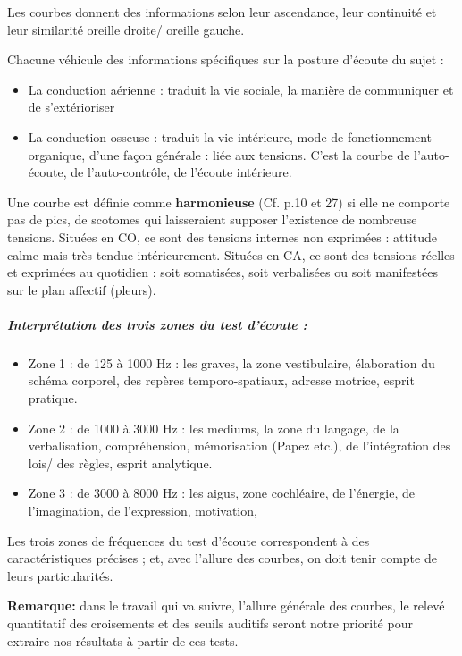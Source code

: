 Les courbes donnent des informations selon leur ascendance, leur
continuité et leur similarité oreille droite/ oreille gauche.
 
Chacune  véhicule des informations spécifiques
sur la posture d'écoute du sujet : 
\begin{itemize}
\item La conduction aérienne : traduit la vie sociale, la manière de communiquer
et de s'extérioriser
\item La conduction osseuse : traduit la vie intérieure, mode de fonctionnement
organique, d'une façon générale : liée aux tensions. C'est la courbe
de l\textquoteright auto-écoute, de l\textquoteright auto-contrôle,
de l'écoute intérieure.
\end{itemize}

Une courbe est définie comme \textbf{harmonieuse} (Cf. p.10 et 27) si elle ne comporte pas de
pics, de scotomes 
qui laisseraient
supposer l'existence de nombreuse tensions.
Situées en CO, ce sont des tensions internes non exprimées : attitude
calme mais très tendue intérieurement.
Situées en CA, ce sont des tensions réelles et exprimées au quotidien
: soit somatisées, soit verbalisées ou soit manifestées sur le plan
affectif (pleurs).

\subparagraph{Interprétation des trois zones du test d'écoute : }
\begin{itemize}
\item Zone 1 : de 125 à 1000 Hz : les graves, la zone vestibulaire, élaboration
du schéma corporel, des repères temporo-spatiaux, adresse motrice,
esprit pratique.
\item Zone 2 : de 1000 à 3000 Hz : les mediums, la zone du langage, de la
  verbalisation, compréhension,%
 mémorisation (Papez etc.), de l'intégration des lois/
 des règles, esprit analytique.
\item Zone 3 : de 3000 à 8000 Hz : les aigus, zone cochléaire, de l'énergie,
  de l'imagination, de l'expression, motivation,
\end{itemize}

Les trois zones de fréquences du test d'écoute correspondent à des
caractéristiques précises ; et, avec l'allure des courbes, on doit
tenir compte de leurs particularités.


\textbf{Remarque:} dans le travail qui va suivre, l'allure générale des courbes, le relevé quantitatif des
  croisements et des seuils auditifs seront notre priorité pour
  extraire nos résultats à partir de ces tests.

